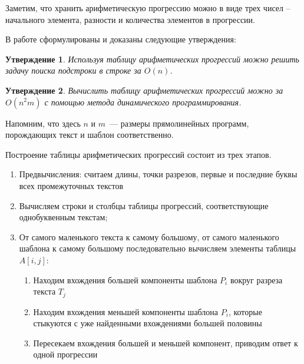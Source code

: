 \documentclass[14pt]{article}
\newtheorem{claim}{Утверждение}[section]
\begin{document}
Заметим, что хранить арифметическую прогрессию можно в виде трех чисел -- начального элемента, разности и количества элементов в прогрессии.

В работе \cite{Lifshits} сформулированы и доказаны следующие утверждения:
\begin{claim} 
Используя таблицу арифметических прогрессий можно решить задачу поиска подстроки в строке за $O(n)$.
\end{claim}
\begin{claim}
Вычислить таблицу арифметических прогрессий можно за $O(n^2m)$ с помощью метода динамического программирования.
\end{claim}

Напомним, что здесь $n$ и $m$~--- размеры прямолинейных программ, порождающих текст и шаблон соответственно.

Построение таблицы арифметических прогрессий состоит из трех этапов.
\begin{enumerate}

\item Предвычисления: считаем длины, точки разрезов, первые и последние буквы всех промежуточных текстов
\item Вычисляем строки и столбцы таблицы прогрессий, соответствующие однобуквенным текстам;
\item От самого маленького текста к самому большому, от самого маленького шаблона к самому большому последовательно вычисляем элементы таблицы $A[i, j]$:
\begin{enumerate}
	\item Находим вхождения большей компоненты шаблона $P_i$ вокруг разреза текста $T_j$
	\item Находим вхождения меньшей компоненты шаблона $P_i$, которые стыкуются с уже найденными вхождениями большей половины
	\item Пересекаем вхождения большей и меньшей компонент, приводим ответ к одной прогрессии
\end{enumerate}
\end{enumerate}
\end{document}
